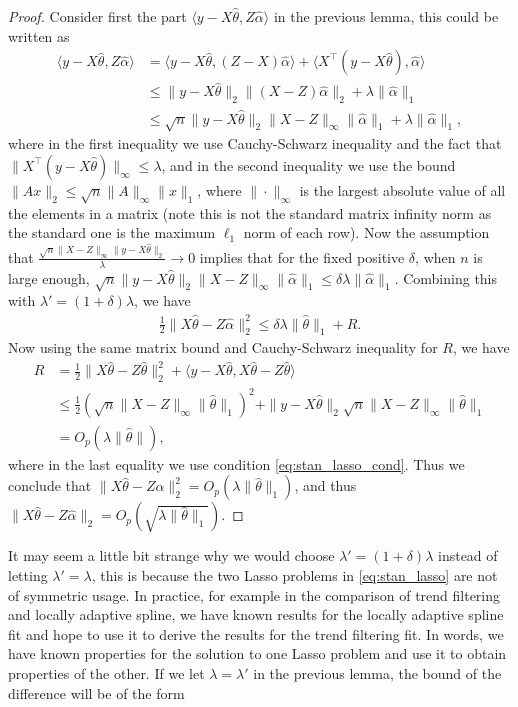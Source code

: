 \documentclass[a4paper]{article}
\newcommand{\ra}{\rangle}
\newcommand{\la}{\langle}
\begin{document}
\begin{proof}
Consider first the part $\la y-X\hat{\theta}, Z\hat{\alpha}\ra$ in the previous lemma, this could be written as
\begin{align*}
\la y - X\hat{\theta}, Z\hat{\alpha}\ra &= \la y-X\hat{\theta}, (Z-X)\hat{\alpha}\ra + \la X^\top(y-X\hat{\theta}), \hat{\alpha}\ra\\
&\leq \|y-X\hat{\theta}\|_2\|(X-Z)\hat{\alpha}\|_2 + \lambda\|\hat{\alpha}\|_1\\
&\leq \sqrt{n}\|y-X\hat{\theta}\|_2\|X-Z\|_\infty\|\hat{\alpha}\|_1 + \lambda\|\hat{\alpha}\|_1,
\end{align*}
where in the first inequality we use Cauchy-Schwarz inequality and the fact that $\|X^\top(y-X\hat{\theta})\|_\infty\leq \lambda$, and in the second inequality we use the bound $\|Ax\|_2\leq \sqrt{n}\|A\|_\infty\|x\|_1$, where $\|\cdot\|_\infty$ is the largest absolute value of all the elements in a matrix (note this is not the standard matrix infinity norm as the standard one is the maximum $\ell_1$ norm of each row). Now the assumption that $\frac{\sqrt{n}\|X-Z\|_\infty\|y-X\hat{\theta}\|_2}{\lambda} \rightarrow 0$ implies that for the fixed positive $\delta$, when $n$ is large enough, $\sqrt{n}\|y-X\hat{\theta}\|_2\|X-Z\|_\infty\|\hat{\alpha}\|_1\leq \delta\lambda\|\hat{\alpha}\|_1$. Combining this with $\lambda' = (1+\delta)\lambda$, we have
\begin{align*}
\frac{1}{2}\|X\hat{\theta} - Z\hat{\alpha}\|_2^2 \leq \delta\lambda\|\hat{\theta}\|_1 + R.
\end{align*}
Now using the same matrix bound and Cauchy-Schwarz inequality for $R$, we have
\begin{align*}
R &= \frac{1}{2}\|X\hat{\theta}-Z\hat{\theta}\|_2^2 + \la y-X\hat{\theta}, X\hat{\theta} - Z\hat{\theta}\ra\\
&\leq \frac{1}{2}(\sqrt{n}\|X-Z\|_\infty\|\hat{\theta}\|_1)^2 + \|y-X\hat{\theta}\|_2\sqrt{n}\|X-Z\|_\infty\|\hat{\theta}\|_1\\
&= O_p(\lambda\|\hat{\theta}\|),
\end{align*}
where in the last equality we use condition \eqref{eq:stan_lasso_cond}. Thus we conclude that $\|X\hat{\theta}-Z\hat{\alpha}\|_2^2 = O_p(\lambda\|\hat{\theta}\|_1)$, and thus $\|X\hat{\theta} - Z\hat{\alpha}\|_2 = O_p(\sqrt{\lambda\|\hat{\theta}\|_1})$.  
\end{proof}

It may seem a little bit strange why we would choose $\lambda' = (1+\delta)\lambda$ instead of letting $\lambda' = \lambda$, this is because the two Lasso problems in \eqref{eq:stan_lasso} are not of symmetric usage. In practice, for example in the comparison of trend filtering and locally adaptive spline, we have known results for the locally adaptive spline fit and hope to use it to derive the results for the trend filtering fit. In words, we have known properties for the solution to one Lasso problem and use it to obtain properties of the other. If we let $\lambda = \lambda'$ in the previous lemma, the bound of the difference will be of the form
\end{document}
